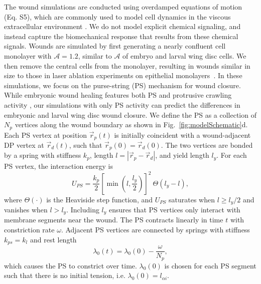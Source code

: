 \documentclass[%
 reprint,
superscriptaddress,
amsmath,amssymb,
prl,
floatfix,
]{revtex4-2}
\begin{document}

The wound simulations are conducted using overdamped equations of motion (Eq. S5), which are commonly used to model cell dynamics in the viscous extracellular environment \cite{barton2017active, delile2017cell}. We do not model explicit chemical signaling, and instead capture the biomechanical response that results from these chemical signals. Wounds are simulated by first generating a nearly confluent cell monolayer with $\mathcal{A} = 1.2$, similar to $\mathcal{A}$ of embryo and larval wing disc cells. We then remove the central cells from the monolayer, resulting in wounds similar in size to those in laser ablation experiments on epithelial monolayers~\cite{tetley2019tissue}. In these simulations, we focus on the purse-string (PS) mechanism for wound closure. While embryonic wound healing features both PS and protrusive crawling activity \cite{tetley2019tissue,abreu2012drosophila}, our simulations with only PS activity can predict the differences in embryonic and larval wing disc wound closure. We define the PS as a collection of $N_{p}$ vertices along the wound boundary as shown in Fig.~\ref{fig:modelSchematic}d. Each PS vertex at position $\vec{r}_p(t)$ is initially coincident with a wound-adjacent DP vertex at $\vec{r}_d(t)$, such that $\vec{r}_p(0) = \vec{r}_d(0)$. The two vertices are bonded by a spring with stiffness $k_{p}$, length $l = |\vec{r}_{p} - \vec{r}_{d}|$, and yield length $l_y$. For each PS vertex, the interaction energy is
\begin{equation}
    \label{eq:energy_k_PS}
    U_{PS} = \frac{k_p}{2} \left[\min\left(l, \frac{l_y}{2}\right)\right]^2 ~ \Theta(l_y - l),
\end{equation}
where $\Theta(\cdot)$ is the Heaviside step function, and $U_{PS}$ saturates when $l \geq l_y/2$ and vanishes when $l > l_y$. Including $l_y$ ensures that PS vertices only interact with membrane segments near the wound. The PS contracts linearly in time $t$ with constriction rate $\omega$. Adjacent PS vertices are connected by springs with stiffness $k_{ps} = k_l$ and rest length 
\begin{equation}
    \label{eq:PS_rest_length}
    \lambda_0(t) = \lambda_0(0) - \frac{\omega}{N_{p}},
\end{equation}
which causes the PS to constrict over time. $\lambda_0(0)$ is chosen for each PS segment such that there is no initial tension, i.e. $\lambda_0(0) = l_{\alpha i}$. 
\end{document}
